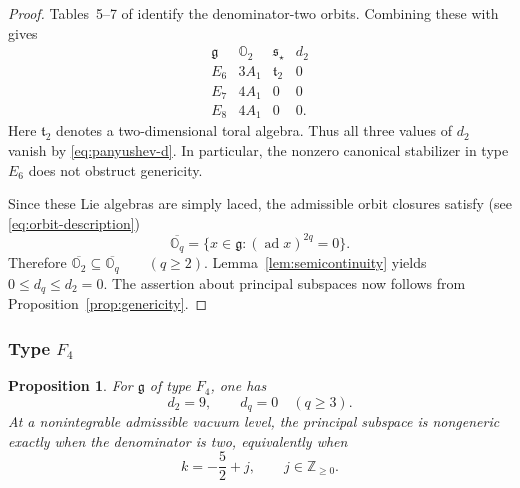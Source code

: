 \documentclass[11pt]{amsart}
\newtheorem{proposition}[theorem]{Proposition}
\theoremstyle{definition}
\theoremstyle{remark}
\begin{document}
\begin{proof}
Tables~5--7 of \cite{AvEM} identify the denominator-two orbits.
Combining these with \cite[Theorem~6.1 and Table~1]{Pan} gives
\[
\begin{array}{c|c|c|c}
 \mathfrak g & \mathbb O_2 & \mathfrak s_\star & d_2\\ \hline
 E_6 & 3A_1 & \mathfrak t_2 & 0\\
 E_7 & 4A_1 & 0 & 0\\
 E_8 & 4A_1 & 0 & 0.
\end{array}
\]
Here $\mathfrak t_2$ denotes a two-dimensional toral algebra.
Thus all three values of $d_2$ vanish by
\eqref{eq:panyushev-d}.
In particular, the nonzero canonical stabilizer in type $E_6$
does not obstruct genericity.

Since these Lie algebras are simply laced, the admissible orbit
closures satisfy (see \eqref{eq:orbit-description})
\[
 \overline{\mathbb O_q}
 =\{x\in\mathfrak g:(\operatorname{ad}x)^{2q}=0\}.
\]
Therefore
$
 \overline{\mathbb O_2}\subseteq\overline{\mathbb O_q}
 \qquad(q\ge2).
$
Lemma~\ref{lem:semicontinuity} yields
$0\le d_q\le d_2=0$.
The assertion about principal subspaces now follows from
Proposition~\ref{prop:genericity}.
\end{proof}

\subsubsection{Type $F_4$}

\begin{proposition}\label{prop:typeF}
For $\mathfrak g$ of type $F_4$, one has
\[
 d_2=9,\qquad d_q=0\quad(q\ge3).
\]
At a nonintegrable admissible vacuum level, the principal subspace
is nongeneric exactly when the denominator is two, equivalently
when
\[
 k=-\frac52+j,\qquad j\in\mathbb Z_{\ge0}.
\]
\end{proposition}
\end{document}
